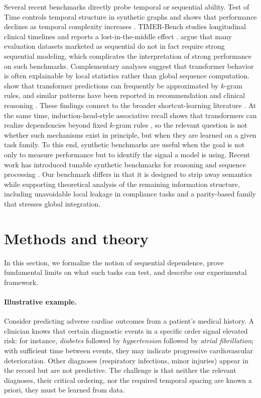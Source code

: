 \documentclass{article}
\theoremstyle{plain}
\theoremstyle{definition}
\theoremstyle{remark}
\begin{document}
Several recent benchmarks directly probe temporal or sequential ability. Test of Time controls temporal structure in synthetic graphs and shows that performance declines as temporal complexity increases \citep{fatemiTESTTIMEBENCHMARK2025}. TIMER-Bench studies longitudinal clinical timelines and reports a lost-in-the-middle effect \citep{cui2025timertemporalinstructionmodeling}. \citet{klenitskiyDoesItLook2024} argue that many evaluation datasets marketed as sequential do not in fact require strong sequential modeling, which complicates the interpretation of strong performance on such benchmarks. Complementary analyses suggest that transformer behavior is often explainable by local statistics rather than global sequence computation. \citet{nguyen2024understanding} show that transformer predictions can frequently be approximated by $k$-gram rules, and similar patterns have been reported in recommendation and clinical reasoning \citep{kimLostSequenceLarge2025b,bediFidelityMedicalReasoning2025}. These findings connect to the broader shortcut-learning literature \citep{mccoy2019right,geirhos2020shortcut,mirzadeh2024gsm}. At the same time, induction-head-style associative recall shows that transformers can realize dependencies beyond fixed $k$-gram rules \citep{olsson2022induction, guMambaLinearTimeSequence2024}, so the relevant question is not whether such mechanisms exist in principle, but when they are learned on a given task family. To this end, synthetic benchmarks are useful when the goal is not only to measure performance but to identify the signal a model is using. Recent work has introduced tunable synthetic benchmarks for reasoning and sequence processing \citep{kaiserCogniLoadSyntheticNatural2025,ramezanaliSeqBenchTunableBenchmark2025}. Our benchmark differs in that it is designed to strip away semantics while supporting theoretical analysis of the remaining information structure, including unavoidable local leakage in compliance tasks and a parity-based family that stresses global integration.
\section{Methods and theory}
\label{sec:formulation}

In this section, we formalize the notion of sequential dependence, prove fundamental limits on what such tasks can test, and describe our experimental framework.

\paragraph{Illustrative example.} Consider predicting adverse cardiac outcomes from a patient's medical history. A clinician knows that certain diagnostic events in a specific order signal elevated risk: for instance, \emph{diabetes} followed by \emph{hypertension} followed by \emph{atrial fibrillation}; with sufficient time between events, they may indicate progressive cardiovascular deterioration. Other diagnoses (respiratory infections, minor injuries) appear in the record but are not predictive. The challenge is that neither the relevant diagnoses, their critical ordering, nor the required temporal spacing are known a priori, they must be learned from data.
\end{document}
